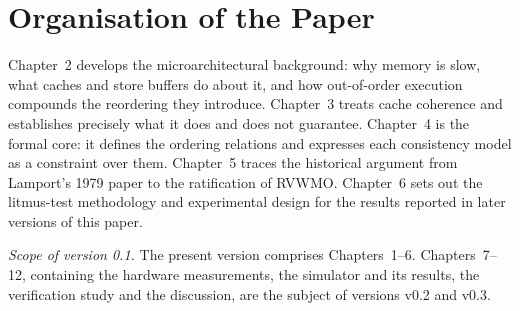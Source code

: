 \section{Organisation of the Paper}
\label{sec:organisation}

Chapter~2 develops the microarchitectural background: why memory is slow, what
caches and store buffers do about it, and how out-of-order execution compounds
the reordering they introduce.
Chapter~3 treats cache coherence and establishes
precisely what it does and does not guarantee.
Chapter~4 is the formal core:
it defines the ordering relations and expresses each consistency model as a
constraint over them.
Chapter~5 traces the historical argument from Lamport's
1979 paper to the ratification of RVWMO. Chapter~6 sets out the litmus-test
methodology and experimental design for the results reported in later versions
of this paper.

\medskip
\noindent\emph{Scope of version 0.1.} The present version comprises Chapters~1--6.
Chapters~7--12, containing the hardware measurements, the simulator and its
results, the verification study and the discussion, are the subject of versions
v0.2 and v0.3.
